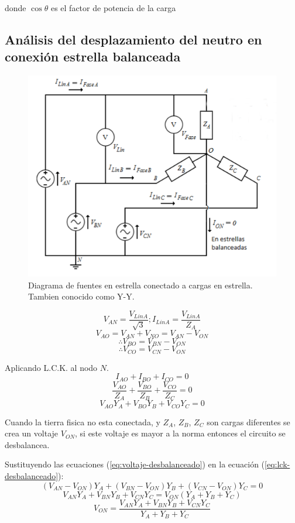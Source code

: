 \documentclass[11pt]{article}
\begin{document}
donde \(\cos\theta\) es el factor de potencia de la carga
\newpage
\subsection{Análisis del desplazamiento del neutro en conexión estrella balanceada}
\label{sec:orgheadline7}
\begin{figure}[htb]
\centering
\includegraphics[width=.9\linewidth]{data/b3/9c0d3b-9738-4e7a-9ce8-bee35cfe403a/screenshot-20151103-204729.png}
\caption{Diagrama de fuentes en estrella conectado a cargas en estrella. Tambien conocido como Y-Y.}
\end{figure}

$$V_{AN}=\frac{V_{LinA}}{\sqrt{3}};I_{LinA}=\frac{V_{LinA}}{Z_{A}}$$
\begin{equation}\label{eq:voltaje-desbalanceado}
V_{AO}=V_{AN}+V_{NO}=V_{AN}-V_{ON}
\end{equation}
$$\therefore V_{BO}=V_{BN}-V_{ON}$$
$$\therefore V_{CO}=V_{CN}-V_{ON}$$

Aplicando L.C.K. al nodo \(N\).
$$I_{AO}+I_{BO}+I_{CO}=0$$
$$\frac{V_{AO}}{Z_A}+\frac{V_{BO}}{Z_B}+\frac{V_{CO}}{Z_C}=0$$
\begin{equation}\label{eq:lck-desbalanceado}
V_{AO}Y_A + V_{BO}Y_B  + V_{CO}Y_C=0
\end{equation}

Cuando la tierra fisica no esta conectada, y \(Z_A\), \(Z_B\), \(Z_C\)
son cargas diferentes se crea un voltaje \(V_{ON}\), si este
voltaje es mayor a la norma entonces el circuito se desbalancea.

Sustituyendo las ecuaciones (\ref{eq:voltaje-desbalanceado}) en la
ecuación (\ref{eq:lck-desbalanceado}):
$$ (V_{AN}-V_{ON}) Y_A+ (V_{BN}-V_{ON}) Y_B+ (V_{CN}-V_{ON}) Y_C=0$$
$$ V_{AN}Y_A + V_{BN}Y_B + V_{CN}Y_C=V_{ON}(Y_A+Y_B+Y_C)$$
\begin{equation}\label{eq:voltaje-neutro}
V_{ON}=\frac{V_{AN}Y_A + V_{BN}Y_B + V_{CN}Y_C}{Y_A+Y_B+Y_C}
\end{equation}
\end{document}
